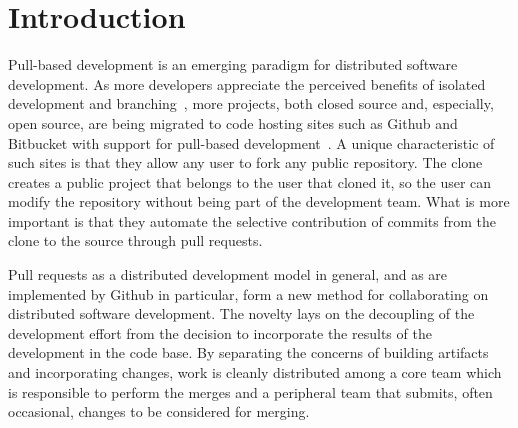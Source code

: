 \documentclass{acm_proc_article-sp}
\begin{document}


\section{Introduction}

%

Pull-based development is an emerging paradigm for distributed software
development. As more developers appreciate the perceived benefits of isolated
development and branching~\cite{Bird12}, more projects, both closed source and,
especially, open source, are being migrated to code hosting sites such as Github
and Bitbucket with support for pull-based development~\cite{Barr12}. A unique
characteristic of such sites is that they allow any user to fork any public
repository. The clone creates a public project that belongs to the user that
cloned it, so the user can modify the repository without being part of the
development team. What is more important is that they automate the selective
contribution of commits from the clone to the source through pull requests. 

Pull requests as a distributed development model
in general, and as are implemented by Github in particular,
form a new method for collaborating on distributed software development. The
novelty lays on the decoupling of the development effort from the decision to
incorporate the results of the development in the code base. By separating the
concerns of building artifacts and incorporating changes, work is cleanly
distributed among a core team which is responsible to perform the merges and a
peripheral team that submits, often occasional, changes to be considered for
merging.
\end{document}
